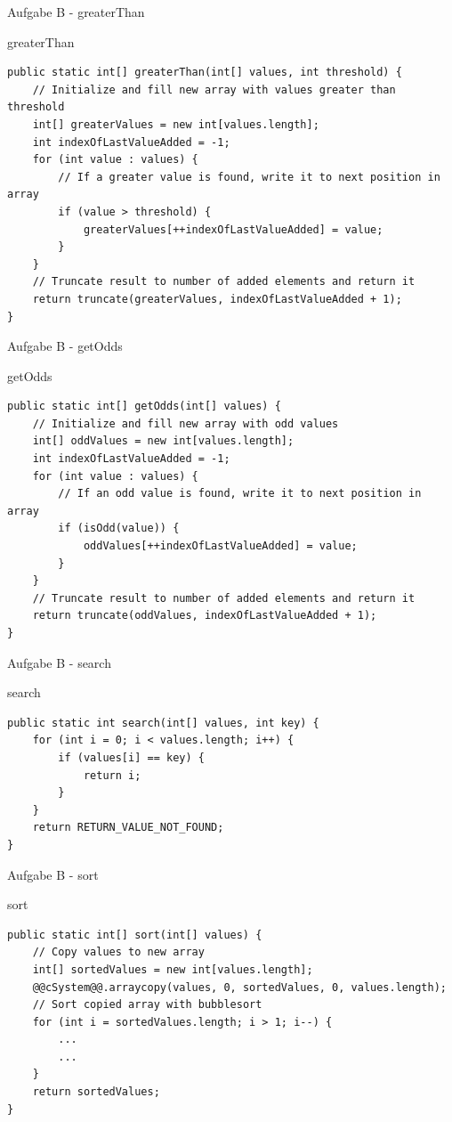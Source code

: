 \documentclass[aspectratio=169]{beamer}
\begin{document}
\begin{frame}[fragile]{Aufgabe B - greaterThan}
  \begin{block}{greaterThan}
    \begin{lstlisting}
public static int[] greaterThan(int[] values, int threshold) {
    // Initialize and fill new array with values greater than threshold
    int[] greaterValues = new int[values.length];
    int indexOfLastValueAdded = -1;
    for (int value : values) {
        // If a greater value is found, write it to next position in array
        if (value > threshold) {
            greaterValues[++indexOfLastValueAdded] = value;
        }
    }
    // Truncate result to number of added elements and return it
    return truncate(greaterValues, indexOfLastValueAdded + 1);
}
    \end{lstlisting}
  \end{block}
\end{frame}


\begin{frame}[fragile]{Aufgabe B - getOdds}
  \begin{block}{getOdds}
    \begin{lstlisting}
public static int[] getOdds(int[] values) {
    // Initialize and fill new array with odd values
    int[] oddValues = new int[values.length];
    int indexOfLastValueAdded = -1;
    for (int value : values) {
        // If an odd value is found, write it to next position in array
        if (isOdd(value)) {
            oddValues[++indexOfLastValueAdded] = value;
        }
    }
    // Truncate result to number of added elements and return it
    return truncate(oddValues, indexOfLastValueAdded + 1);
}
    \end{lstlisting}
  \end{block}
\end{frame}



\begin{frame}[fragile]{Aufgabe B - search}
  \begin{block}{search}
    \begin{lstlisting}
public static int search(int[] values, int key) {
    for (int i = 0; i < values.length; i++) {
        if (values[i] == key) {
            return i;
        }
    }
    return RETURN_VALUE_NOT_FOUND;
}
    \end{lstlisting}
  \end{block}
\end{frame}

\begin{frame}[fragile]{Aufgabe B - sort}
  \begin{block}{sort}
    \begin{lstlisting}
public static int[] sort(int[] values) {
    // Copy values to new array
    int[] sortedValues = new int[values.length];
    @@cSystem@@.arraycopy(values, 0, sortedValues, 0, values.length);
    // Sort copied array with bubblesort
    for (int i = sortedValues.length; i > 1; i--) {
        ...
        ...
    }
    return sortedValues;
}
    \end{lstlisting}
  \end{block}
\end{frame}
\end{document}
